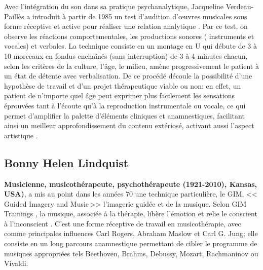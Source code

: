 Avec l'intégration du son dans sa pratique psychanalytique,
Jacqueline Verdeau-Paillès a introduit  à partir de 1985  un test d'audition d'\oe uvres musicales
sous forme réceptive et active pour réaliser
une relation analytique \autocite{verdeau-pailles:bilan}.
Par ce test, on
observe les réactions comportementales, les productions sonores (
instruments et vocales) et verbales. La technique consiste en un montage en U qui débute de 3 à 10
morceaux en fondus enchaînés (sans interruption) de 3 à 4 minutes chacun, selon les
critères de la culture, l'âge, le milieu,
amène progressivement le patient à un état de détente
avec verbalisation. De ce procédé découle la possibilité
d'une hypothèse de
travail et d'un projet thérapeutique viable ou non:
en effet, un patient de n'importe quel âge peut exprimer plus facilement les
sensations éprouvées tant à l'écoute qu'à la reproduction
instrumentale ou vocale, ce qui permet d'amplifier la palette d'éléments
cliniques et anamnestiques, facilitant ainsi un meilleur approfondissement du
contenu extériosé, activant aussi l'aspect artistique
\autocite{verdeau_expression}.



\subsection{Bonny Helen Lindquist}

\textbf{ Musicienne, musicothérapeute, psychothérapeute (1921-2010), Kansas, USA)},
a mis au point dans les années 70
une technique particulière, le GIM, <<\,Guided Imagery and Music\,>>
l'imagerie guidée et de la musique. Selon GIM
Trainings \autocite{gim_site}, la
musique, associée à la thérapie, libère l'émotion et relie le
conscient à l'inconscient \autocite{bonny_gim}.
 C'est une forme réceptive de travail
 en musicothérapie, avec comme principales influences Carl Rogers,
 Abraham Maslow  \autocite{maslow-key}
et Carl G. Jung;
elle  consiste en un long parcours  anamnestique permettant de cibler le programme de musiques appropriées tels Beethoven, Brahms, Debussy,
Mozart, Rachmaninov ou Vivaldi.

